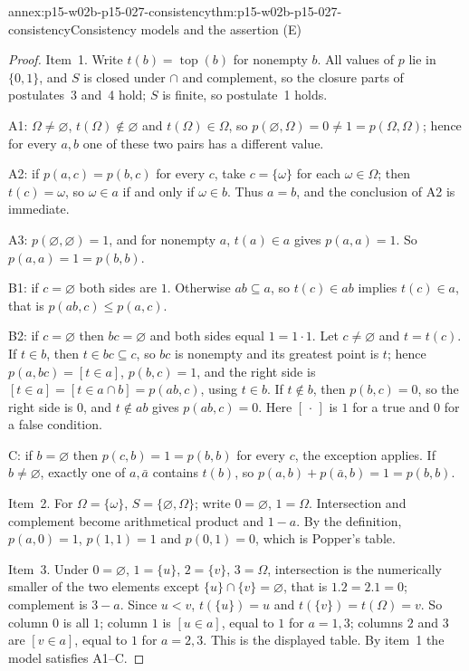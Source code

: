 \begin{annexitem}{annex:p15-w02b-p15-027-consistency}{thm:p15-w02b-p15-027-consistency}{Consistency models and the assertion (E)}
\begin{proof}
Item~1. Write \(t(b)=\operatorname{top}(b)\) for nonempty \(b\). All values
of \(p\) lie in \(\{0,1\}\), and \(S\) is closed under \(\cap\) and
complement, so the closure parts of postulates~3 and~4 hold; \(S\) is
finite, so postulate~1 holds.

A1: \(\Omega\neq\varnothing\), \(t(\Omega)\notin\varnothing\) and
\(t(\Omega)\in\Omega\), so \(p(\varnothing,\Omega)=0\neq1=p(\Omega,\Omega)\);
hence for every \(a,b\) one of these two pairs has a different value.

A2: if \(p(a,c)=p(b,c)\) for every \(c\), take \(c=\{\omega\}\) for each
\(\omega\in\Omega\); then \(t(c)=\omega\), so \(\omega\in a\) if and only if
\(\omega\in b\). Thus \(a=b\), and the conclusion of A2 is immediate.

A3: \(p(\varnothing,\varnothing)=1\), and for nonempty \(a\),
\(t(a)\in a\) gives \(p(a,a)=1\). So \(p(a,a)=1=p(b,b)\).

B1: if \(c=\varnothing\) both sides are \(1\). Otherwise
\(ab\subseteq a\), so \(t(c)\in ab\) implies \(t(c)\in a\), that is
\(p(ab,c)\leqslant p(a,c)\).

B2: if \(c=\varnothing\) then \(bc=\varnothing\) and both sides equal
\(1=1\cdot1\). Let \(c\neq\varnothing\) and \(t=t(c)\). If \(t\in b\), then
\(t\in bc\subseteq c\), so \(bc\) is nonempty and its greatest point is
\(t\); hence \(p(a,bc)=[t\in a]\), \(p(b,c)=1\), and the right side is
\([t\in a]=[t\in a\cap b]=p(ab,c)\), using \(t\in b\). If \(t\notin b\),
then \(p(b,c)=0\), so the right side is \(0\), and \(t\notin ab\) gives
\(p(ab,c)=0\). Here \([\,\cdot\,]\) is \(1\) for a true and \(0\) for a false
condition.

C: if \(b=\varnothing\) then \(p(c,b)=1=p(b,b)\) for every \(c\), the
exception applies. If \(b\neq\varnothing\), exactly one of \(a,\bar a\)
contains \(t(b)\), so \(p(a,b)+p(\bar a,b)=1=p(b,b)\).

Item~2. For \(\Omega=\{\omega\}\), \(S=\{\varnothing,\Omega\}\); write
\(0=\varnothing\), \(1=\Omega\). Intersection and complement become
arithmetical product and \(1-a\). By the definition,
\(p(a,0)=1\), \(p(1,1)=1\) and \(p(0,1)=0\), which is Popper's table.

Item~3. Under \(0=\varnothing\), \(1=\{u\}\), \(2=\{v\}\), \(3=\Omega\),
intersection is the numerically smaller of the two elements except
\(\{u\}\cap\{v\}=\varnothing\), that is \(1.2=2.1=0\); complement is
\(3-a\). Since \(u<v\), \(t(\{u\})=u\) and \(t(\{v\})=t(\Omega)=v\). So
column \(0\) is all \(1\); column \(1\) is \([u\in a]\), equal to \(1\) for
\(a=1,3\); columns \(2\) and \(3\) are \([v\in a]\), equal to \(1\) for
\(a=2,3\). This is the displayed table. By item~1 the model satisfies
A1--C.


\end{proof}
\end{annexitem}
